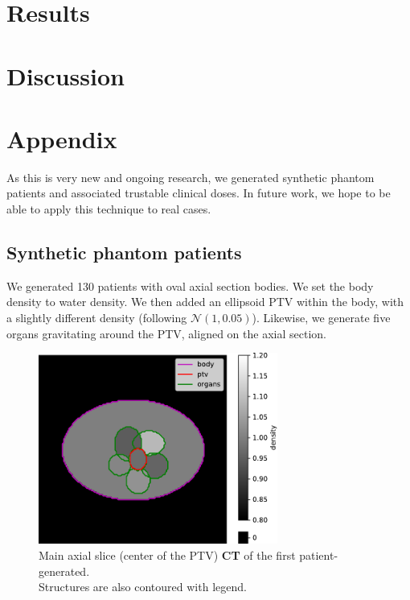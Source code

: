 \section{Results}



\section{Discussion}


\section*{Appendix}
As this is very new and ongoing research, we generated synthetic phantom patients and associated trustable clinical doses.
In future work, we hope to be able to apply this technique to real cases.

\subsection*{Synthetic phantom patients}
We generated 130 patients with oval axial section bodies.
We set the body density to water density.
We then added an ellipsoid PTV within the body, with a slightly different density (following $\mathcal{N}(1,0.05)$).
Likewise, we generate five organs gravitating around the PTV, aligned on the axial section.

\begin{figure}
	\centering
	\includegraphics[width=0.7\textwidth]{main_slice-ct.pdf}
	\caption{Main axial slice (center of the PTV) \textbf{CT} of the first patient-generated.\\
		Structures are also contoured with legend.}
	\label{fig:main_slice-ct}
\end{figure}

